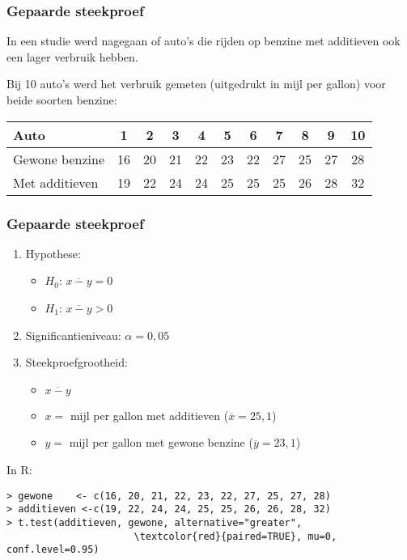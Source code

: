 \documentclass[aspectratio=169]{beamer}
\begin{document}
\begin{frame}
  \frametitle{Gepaarde steekproef}
  
  In een studie werd nagegaan of auto's die rijden op benzine met additieven ook een lager verbruik hebben.
  
  Bij 10 auto's werd het verbruik gemeten (uitgedrukt in mijl per gallon) voor beide soorten benzine:
  
  \vspace{.5cm}
  \centering
  \begin{tabular}{|l|c|c|c|c|c|c|c|c|c|c|}
  	\hline
  	Auto           & 1  & 2  & 3  & 4  & 5  & 6  & 7  & 8  & 9  & 10 \\ \hline
  	Gewone benzine & 16 & 20 & 21 & 22 & 23 & 22 & 27 & 25 & 27 & 28 \\ \hline
  	Met additieven & 19 & 22 & 24 & 24 & 25 & 25 & 25 & 26 & 28 & 32 \\ \hline
  \end{tabular} 
\end{frame}

\begin{frame}[fragile]
  \frametitle{Gepaarde steekproef}
\begin{enumerate}
    \item Hypothese:
    \begin{itemize}
        \item $H_0$: $\overline{x-y} = 0$
        \item $H_1$: $\overline{x-y} > 0$
    \end{itemize}
    \item Significantieniveau: $\alpha = 0,05$
    \item Steekproefgrootheid:
    \begin{itemize}
        \item $\overline{x-y}$
        \item $x =$ mijl per gallon met additieven ($\overline{x}=25,1$)
        \item $y =$ mijl per gallon met gewone benzine ($\overline{y}=23,1$)
    \end{itemize}
\end{enumerate}
\vfill
In R:
{\footnotesize
    \begin{Verbatim}[commandchars=\\\{\}]
> gewone    <- c(16, 20, 21, 22, 23, 22, 27, 25, 27, 28)
> additieven <-c(19, 22, 24, 24, 25, 25, 26, 26, 28, 32)
> t.test(additieven, gewone, alternative="greater",
                      \textcolor{red}{paired=TRUE}, mu=0, conf.level=0.95)
    \end{Verbatim}
}
\end{frame}
\end{document}
